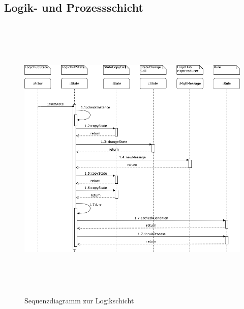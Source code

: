 
    \subsection{Logik- und Prozessschicht}

    \begin{figure}[hbt!]
        \centering
        \includegraphics[width=14cm,height=14cm,keepaspectratio]{images/Logikschicht_Sequenz_final.png}
        \caption{Sequenzdiagramm zur Logikschicht}
        \label{fig:logiksequenz}
    \end{figure}
        


